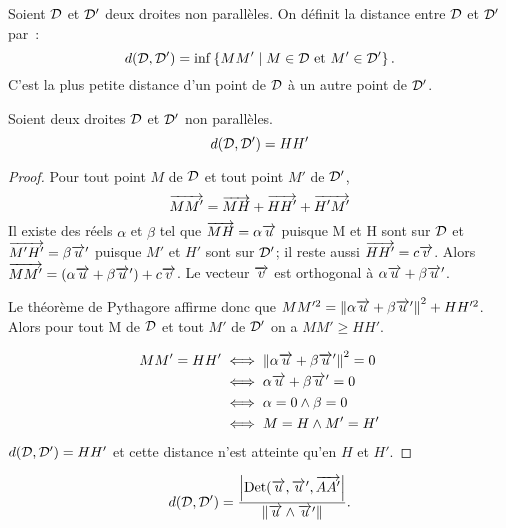 \begin{defdef}
  Soient \(\mathcal{D}\) et \(\mathcal{D}'\) deux droites non parallèles. On définit la 
  distance entre \(\mathcal{D}\) et \(\mathcal{D}'\) par~:
  \begin{equation}
    d(\mathcal{D}, \mathcal{D}') = \inf\left\{MM'\mathrel{}\middle|\mathrel{}M \in \mathcal{D} \text{~et~} M'\in \mathcal{D}'\right\}.
  \end{equation}
  C'est la plus petite distance d'un point de \(\mathcal{D}\) à un autre point de 
  \(\mathcal{D}'\).
\end{defdef}

\begin{prop}
  Soient deux droites \(\mathcal{D}\) et \(\mathcal{D}'\) non parallèles.
  \begin{equation}
    d(\mathcal{D}, \mathcal{D}') = HH'
  \end{equation}
\end{prop}

\begin{proof}
  Pour tout point \(M\) de \(\mathcal{D}\) et tout point \(M'\) de \(\mathcal{D}'\), 
  \begin{equation}
    \overrightarrow{MM'} = \overrightarrow{MH} + \overrightarrow{HH'} + \overrightarrow{H'M'}
  \end{equation}
  Il existe des réels \(\alpha\) et \(\beta\) tel que \(\overrightarrow{MH} = 
  \alpha\overrightarrow{u}\) puisque M et H sont sur \(\mathcal{D}\) et \(\overrightarrow{M'H'} = \beta\overrightarrow{u}'\) 
  puisque \(M'\) et \(H'\) sont sur \(\mathcal{D}'\); il reste aussi \(\overrightarrow{HH'} = 
  c\overrightarrow{v}\). Alors \(\overrightarrow{MM'} = (\alpha\overrightarrow{u} + \beta\overrightarrow{u}') + c\overrightarrow{v}\). Le vecteur 
  \(\overrightarrow{v}\) est orthogonal à \(\alpha\overrightarrow{u} + \beta\overrightarrow{u}'\).

  Le théorème de Pythagore affirme donc que \(MM'^2 = \left\lVert\alpha\overrightarrow{u} + 
  \beta\overrightarrow{u}'\right\rVert^2 + HH'^2\). Alors pour tout M de \(\mathcal{D}\) et tout \(M'\) de 
  \(\mathcal{D}'\) on a \(MM'\geqslant HH'\).

  \begin{align}
    MM' = HH' &\iff \left\lVert\alpha\overrightarrow{u} + \beta\overrightarrow{u}'\right\rVert^2 = 0\\
              &\iff \alpha\overrightarrow{u} + \beta\overrightarrow{u}' = 0\\
              &\iff \alpha = 0 \wedge \beta = 0\\
              &\iff M = H \wedge M' = H'
  \end{align}
  \(d(\mathcal{D}, \mathcal{D}') = HH'\) et cette distance n'est atteinte qu'en \(H\) et 
  \(H'\).
\end{proof}

\begin{prop}
  \begin{equation}
    d(\mathcal{D}, \mathcal{D}') = \frac{\left\lvert\operatorname{Det}(\overrightarrow{u}, \overrightarrow{u}', 
    \overrightarrow{AA'}\right\rvert}{\left\lVert\overrightarrow{u}\wedge\overrightarrow{u}'\right\rVert}.
  \end{equation}
\end{prop}

